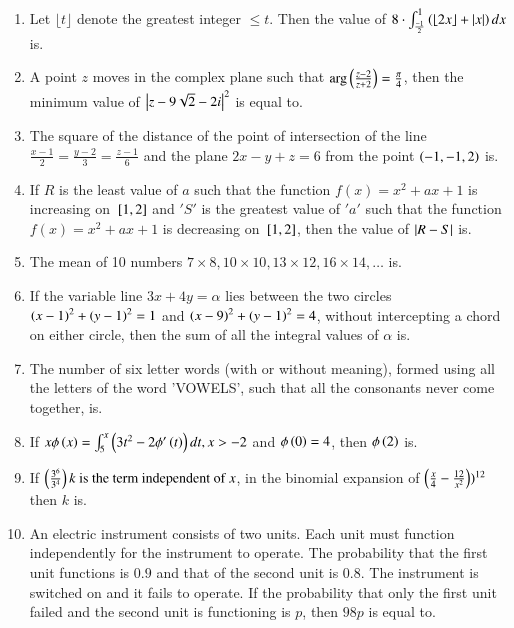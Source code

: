 \documentclass[journal]{IEEEtran}
\begin{document}
\begin{enumerate}[start=1]
\item Let $\lfloor t\rfloor$ denote the greatest integer $\leq t$. Then the value of $8 \cdot \int_{\frac{-1}{2}}^{1} \left(\lfloor 2x\rfloor + \left\vert x\right\vert\right) dx $
is.
\item A point $z$ moves in the complex plane such that 
$\arg\left(\frac{z - 2}{z + 2}\right) = \frac{\pi}{4}$, then the minimum value of $\left\vert z - 9\sqrt{2} - 2i\right\vert^2$ is equal to.
\item  The square of the distance of the point of intersection of the line 
$\frac{x - 1}{2} = \frac{y - 2}{3} = \frac{z - 1}{6}$
and the plane $2x - y + z = 6$ from the point $\left(-1, -1, 2\right)$ is.
\item If $R$ is the least value of $a$ such that the function $f(x) = x^2 + ax + 1$ is increasing on ${}\left[1, 2\right]$ and $'S'$ is the greatest value of $'a'$ such that the function $f(x) = x^2 + ax + 1$ is decreasing on ${}\left[1, 2\right]$, then the value of $\left\vert R - S\right\vert$ is.
\item The mean of 10 numbers $7 \times 8, 10 \times 10, 13 \times 12, 16 \times 14, \dots$ is.
\item  If the variable line $3x + 4y = \alpha$ lies between the two circles $\left(x - 1\right)^2 + \left(y - 1\right)^2 = 1$ and $\left(x - 9\right)^2 + \left(y - 1\right)^2 = 4$, without intercepting a chord on either circle, then the sum of all the integral values of $\alpha$ is.
\item The number of six letter words (with or without meaning), formed using all the letters of the word 'VOWELS', such that all the consonants never come together, is.
\item If $x\phi\left(x\right) =\int_{5}^{x}\left(3t^2 - 2\phi^\prime\left(t\right)\right) dt, x > -2$
and $\phi\left(0\right) = 4$, then $\phi\left(2\right)$ is.
\item If $\left(\frac{3^6}{3^4}\right)k \text{ is the term independent of } x$, in the binomial expansion of $\left(\frac{x}{4} - \frac{12}{x^2}\right))^{12}
$ then $k$ is.
\item An electric instrument consists of two units. Each unit must function independently for the instrument to operate. The probability that the first unit functions is $0.9$ and that of the second unit is $0.8$. The instrument is switched on and it fails to operate. If the probability that only the first unit failed and the second unit is functioning is $p$, then $98p$ is equal to.
\end{enumerate}
\end{document}
